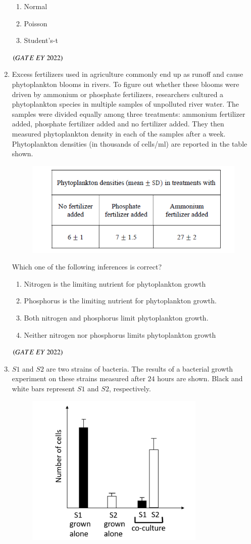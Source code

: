 \documentclass[journal]{IEEEtran}
\numberwithin{equation}{enumi}
\numberwithin{figure}{enumi}
\begin{document}
\begin{enumerate}
\begin{enumerate}
        \item  Normal
        \item  Poisson
        \item  Student's-t
    \end{enumerate}
    \hfill{$\brak{ GATE\ EY\ 2022}$}
    \bigskip
 \item Excess fertilizers used in agriculture commonly end up as runoff and cause
phytoplankton blooms in rivers. To figure out whether these blooms were driven by
ammonium or phosphate fertilizers, researchers cultured a phytoplankton species in
multiple samples of unpolluted river water. The samples were divided equally among
three treatments: ammonium fertilizer added, phosphate fertilizer added and no
fertilizer added. They then measured phytoplankton density in each of the samples
after a week. Phytoplankton densities (in thousands of cells/ml) are reported in the
table shown.
\begin{figure}[H]
    \centering
\includegraphics[width=0.5\columnwidth]{figs/7.png}
    \caption{}
    \label{fig:7}
   \end{figure}
Which one of the following inferences is correct?
    \begin{enumerate}
        \item  Nitrogen is the limiting nutrient for phytoplankton growth
        \item  Phosphorus is the limiting nutrient for phytoplankton growth.
        \item  Both nitrogen and phosphorus limit phytoplankton growth.
        \item  Neither nitrogen nor phosphorus limits phytoplankton growth
    \end{enumerate}
    \hfill{$\brak{ GATE\ EY\ 2022}$}
    \bigskip
 \item $S1$ and $S2$ are two strains of bacteria. The results of a bacterial growth experiment
on these strains measured after $24$ hours are shown. Black and white bars represent
$S1$ and $S2$, respectively.
\begin{figure}[H]
    \centering
\includegraphics[width=0.5\columnwidth]{figs/8.png}

\end{figure}
\end{enumerate}
\end{document}
